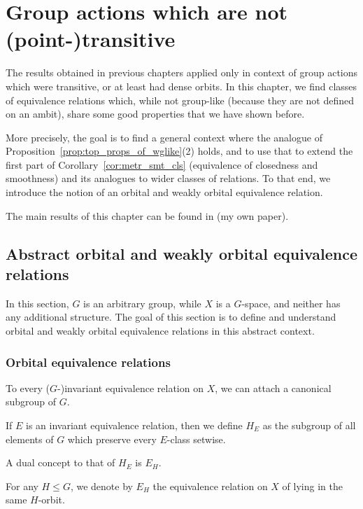 
	\chapter{Group actions which are not (point-)transitive}
	\label{chap:intransitive}
	The results obtained in previous chapters applied only in context of group actions which were transitive, or at least had dense orbits. In this chapter, we find classes of equivalence relations which, while not group-like (because they are not defined on an ambit), share some good properties that we have shown before.
	
	More precisely, the goal is to find a general context where the analogue of Proposition~\ref{prop:top_props_of_wglike}(2) holds, and to use that to extend the first part of Corollary~\ref{cor:metr_smt_cls} (equivalence of closedness and smoothness) and its analogues to wider classes of relations. To that end, we introduce the notion of an orbital and weakly orbital equivalence relation.
	
	The main results of this chapter can be found in \cite{Rz16} (my own paper).
	
	\section[Abstract orbital and weakly orbital equivalence relations]{Abstract orbital and weakly orbital equivalence relations}
	\label{sec:general}
	In this section, $G$ is an arbitrary group, while $X$ is a $G$-space, and neither has any additional structure. The goal of this section is to define and understand orbital and weakly orbital equivalence relations in this abstract context.
	
	\subsection*{Orbital equivalence relations}
	\label{ssec:orbital}
	To every ($G$-)invariant equivalence relation on $X$, we can attach a canonical subgroup of $G$.
	\begin{dfn}
		\label{dfn:HE}
		If $E$ is an invariant equivalence relation, then we define $H_E$ as the subgroup of all elements of $G$ which preserve every $E$-class setwise.\xqed{\lozenge}
	\end{dfn}
	
	A dual concept to that of $H_E$ is $E_H$.
	\begin{dfn}
		\index{EH@$E_H$}
		For any $H\leq G$, we denote by $E_H$ the equivalence relation on $X$ of lying in the same $H$-orbit.\xqed{\lozenge}
	\end{dfn}
	
